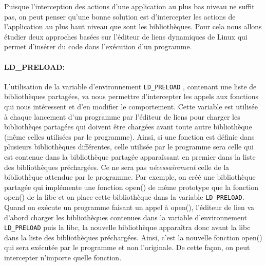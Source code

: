 Puisque l'interception des actions d'une application au plus bas niveau ne
suffit pas, on peut penser qu'une bonne solution est d'intercepter les actions
de l'application au plus haut niveau que sont les bibliothèques. Pour cela nous
allons étudier deux approches basées sur l'éditeur de liens dynamiques de Linux
qui permet d'insérer du code dans l'exécution d'un programme.

\paragraph{LD\_PRELOAD:}
\label{paragraphe:LDPreload}

L'utilisation de la variable d'environnement \texttt{LD\_PRELOAD}
\citep{LDPreload}, contenant une liste de bibliothèques partagées, va nous
permettre d'intercepter les appels aux fonctions qui nous intéressent et d'en
modifier le comportement. Cette variable est utilisée à chaque lancement d'un
programme par l'éditeur de liens pour charger les bibliothèqes partagées qui
doivent être chargées avant toute autre bibliothèque (même celles utilisées par
le programme). Ainsi, si une fonction est définie dans plusieurs bibliothèques
différentes, celle utilisée par le programme sera celle qui est contenue dans la
bibliothèque partagée apparaîssant en premier dans la liste des bibliothèques
préchargées. Ce ne sera pas \textit{nécessairement} celle de la bibliothèque
attendue par le programme. Par exemple, on créé une bibliothèque partagée qui
implémente une fonction open() de même prototype que la fonction open() de la
libc et on place cette bibliothèque dans la variable \texttt{LD\_PRELOAD}. Quand
on exécute un programme faisant un appel à open(), l'éditeur de lien va d'abord
charger les bibliothèques contenues dans la variable d'environnement
\texttt{LD\_PRELOAD} puis la libc, la nouvelle bibliothèque apparaîtra donc
avant la libc dans la liste des bibliothèques préchargées. Ainsi, c'est la
nouvelle fonction open() qui sera exécutée par le programme et non
l'originale. De cette façon, on peut intercepter n'importe quelle fonction.

